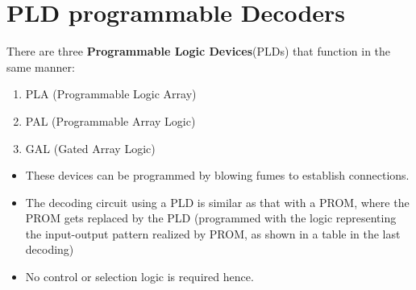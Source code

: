 \section{PLD programmable Decoders}
There are three \textbf{Programmable Logic Devices}(PLDs) that function in the same manner:
\begin{enumerate}
  \item PLA (Programmable Logic Array)
  \item PAL (Programmable Array Logic)
  \item GAL (Gated Array Logic)
\end{enumerate}
\begin{itemize}
  \item These devices can be programmed by blowing fumes to establish connections.
  \item The decoding circuit using a PLD is similar as that with a PROM, where the PROM gets replaced by the PLD (programmed with the logic representing the input-output pattern realized by PROM, as shown in a table in the last decoding)
  \item No control or selection logic is required hence. 
\end{itemize}
